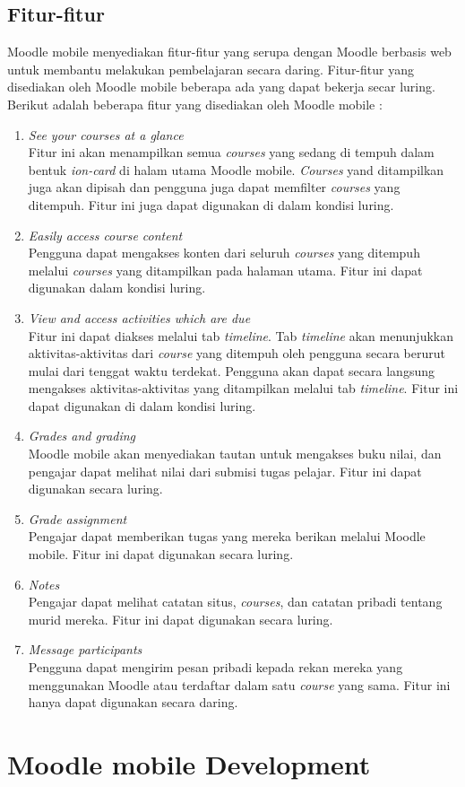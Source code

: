 \subsection{Fitur-fitur}
Moodle mobile menyediakan fitur-fitur yang serupa dengan Moodle berbasis web untuk membantu melakukan pembelajaran secara daring. Fitur-fitur yang disediakan oleh Moodle mobile beberapa ada yang dapat bekerja secar luring. Berikut adalah beberapa fitur yang disediakan oleh Moodle mobile \cite{Moodlemobile:features}:

	\begin{enumerate}
		\item \textit{See your courses at a glance} \\
			Fitur ini akan menampilkan semua \textit{courses} yang sedang di tempuh dalam bentuk \textit{ion-card} di halam utama Moodle mobile. \textit{Courses} yand ditampilkan juga akan dipisah %
			dan pengguna juga dapat memfilter \textit{courses} yang ditempuh. Fitur ini juga dapat digunakan di dalam kondisi luring.
		\item \textit{Easily access course content} \\
			Pengguna dapat mengakses konten dari seluruh \textit{courses} yang ditempuh melalui \textit{courses} yang ditampilkan pada halaman utama. Fitur ini dapat digunakan dalam kondisi luring.
		\item \textit{View and access activities which are due} \\
			Fitur ini dapat diakses melalui tab \textit{timeline}. Tab \textit{timeline} akan menunjukkan aktivitas-aktivitas dari \textit{course} yang ditempuh oleh pengguna secara berurut mulai dari tenggat waktu terdekat. Pengguna akan dapat secara langsung mengakses aktivitas-aktivitas yang ditampilkan melalui tab \textit{timeline}. Fitur ini dapat digunakan di dalam kondisi luring.
		\item \textit{Grades and grading} \\
			Moodle mobile akan menyediakan tautan untuk mengakses buku nilai, dan pengajar dapat melihat nilai dari submisi tugas pelajar. Fitur ini dapat digunakan secara luring.
		\item \textit{Grade assignment} \\
			Pengajar dapat memberikan tugas yang mereka berikan melalui Moodle mobile. Fitur ini dapat digunakan secara luring.
		\item \textit{Notes} \\
			Pengajar dapat melihat catatan situs, \textit{courses}, dan catatan pribadi tentang murid mereka. Fitur ini dapat digunakan secara luring.
		\item \textit{Message participants} \\
			Pengguna dapat mengirim pesan pribadi kepada rekan mereka yang menggunakan Moodle atau terdaftar dalam satu \textit{course} yang sama. Fitur ini hanya dapat digunakan secara daring.

	\end{enumerate}

\section{Moodle mobile Development}
\label{sec:MoodleAppDev}